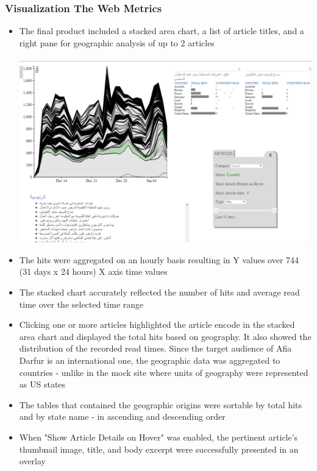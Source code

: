 \documentclass[12pt]{article}
\begin{document}
\subsubsection{Visualization The Web Metrics}
\begin{itemize}
\item The final product included a stacked area chart, a list of article titles, and a right pane for geographic analysis of up to 2 articles
\\ \\
\noindent\includegraphics[scale=0.5]{img/afiadarfur_main_viz} \\
\item The hits were aggregated on an hourly basis resulting in Y values over 744 (31 days x 24 hours) X axis time values
\item The stacked chart accurately reflected the number of hits and average read time over the selected time range
\item Clicking one or more articles highlighted the article encode in the stacked area chart and displayed the total hits based on geography. It also showed the distribution of the recorded read times. Since the target audience of Afia Darfur is an international one, the geographic data was aggregated to countries - unlike in the mock site where units of geography were represented as US states
\item The tables that contained the geographic origins were sortable by total hits and by state name - in ascending and descending order
\item When "Show Article Details on Hover" was enabled, the pertinent article's thumbnail image, title, and body excerpt were successfully presented in an overlay \\ \\

\end{itemize}
\end{document}
